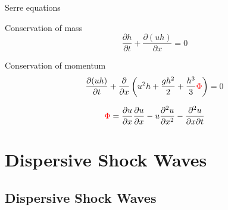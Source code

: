 \documentclass[pdf]{beamer}
\begin{document}
\begin{frame}{Serre equations}

	Conservation of mass
	\[
	\dfrac{\partial h}{\partial t} + \dfrac{\partial (uh)}{\partial x} = 0
	\]
	
	Conservation of momentum
	\begin{equation*}
	\dfrac{\partial (uh)}{\partial t} + \dfrac{\partial}{\partial x} \left ( u^2h + \dfrac{gh^2}{2} + \dfrac{h^3}{3}{\color{red} \Phi }   \right )  = 0
	\end{equation*}
	
	\[ 	{\color{red} \Phi }  = \dfrac{\partial u }{\partial x} \dfrac{\partial u}{\partial x} -u \dfrac{\partial^2 u}{\partial x^2}  - \dfrac{\partial^2 u}{\partial x \partial t}  \]
\end{frame}



\section{Dispersive Shock Waves}
\subsection{Dispersive Shock Waves}
\end{document}
